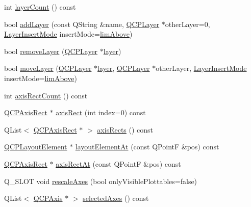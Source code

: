 \begin{DoxyCompactItemize}
\item 
int \hyperlink{classQCustomPlot_a1b3926884f5bd4bdda1495d8b3c891d0}{layer\+Count} () const 
\item 
bool \hyperlink{classQCustomPlot_ad5255393df078448bb6ac83fa5db5f52}{add\+Layer} (const Q\+String \&name, \hyperlink{classQCPLayer}{Q\+C\+P\+Layer} $\ast$other\+Layer=0, \hyperlink{classQCustomPlot_a75a8afbe6ef333b1f3d47abb25b9add7}{Layer\+Insert\+Mode} insert\+Mode=\hyperlink{classQCustomPlot_a75a8afbe6ef333b1f3d47abb25b9add7a062b0b7825650b432a713c0df6742d41}{lim\+Above})
\item 
bool \hyperlink{classQCustomPlot_a40f75e342c5eaab6a86066a42a0e2a94}{remove\+Layer} (\hyperlink{classQCPLayer}{Q\+C\+P\+Layer} $\ast$\hyperlink{classQCustomPlot_aac492da01782820454e9136a8db28182}{layer})
\item 
bool \hyperlink{classQCustomPlot_ae896140beff19424e9e9e02d6e331104}{move\+Layer} (\hyperlink{classQCPLayer}{Q\+C\+P\+Layer} $\ast$\hyperlink{classQCustomPlot_aac492da01782820454e9136a8db28182}{layer}, \hyperlink{classQCPLayer}{Q\+C\+P\+Layer} $\ast$other\+Layer, \hyperlink{classQCustomPlot_a75a8afbe6ef333b1f3d47abb25b9add7}{Layer\+Insert\+Mode} insert\+Mode=\hyperlink{classQCustomPlot_a75a8afbe6ef333b1f3d47abb25b9add7a062b0b7825650b432a713c0df6742d41}{lim\+Above})
\item 
int \hyperlink{classQCustomPlot_a340fa24b1607e445cedda9685670ead3}{axis\+Rect\+Count} () const 
\item 
\hyperlink{classQCPAxisRect}{Q\+C\+P\+Axis\+Rect} $\ast$ \hyperlink{classQCustomPlot_a4a37a1add5fe63060ac518cf0a4c4050}{axis\+Rect} (int index=0) const 
\item 
Q\+List$<$ \hyperlink{classQCPAxisRect}{Q\+C\+P\+Axis\+Rect} $\ast$ $>$ \hyperlink{classQCustomPlot_afd67094aaeccbc5719761348b2d8c891}{axis\+Rects} () const 
\item 
\hyperlink{classQCPLayoutElement}{Q\+C\+P\+Layout\+Element} $\ast$ \hyperlink{classQCustomPlot_a840458186d4483c8a42d6a399448d38f}{layout\+Element\+At} (const Q\+PointF \&pos) const 
\item 
\hyperlink{classQCPAxisRect}{Q\+C\+P\+Axis\+Rect} $\ast$ \hyperlink{classQCustomPlot_af903c081aaf7201631d3607905cc9afc}{axis\+Rect\+At} (const Q\+PointF \&pos) const 
\item 
Q\+\_\+\+S\+L\+OT void \hyperlink{classQCustomPlot_ad86528f2cee6c7e446dea4a6e8839935}{rescale\+Axes} (bool only\+Visible\+Plottables=false)
\item 
Q\+List$<$ \hyperlink{classQCPAxis}{Q\+C\+P\+Axis} $\ast$ $>$ \hyperlink{classQCustomPlot_aa6baf867e8beb96ed5bd471f83ece903}{selected\+Axes} () const 

\end{DoxyCompactItemize}
